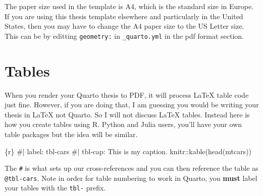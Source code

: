 \documentclass[
  letterpaper,
  11pt,
  english,
  singlespacing,
  headsepline]{MastersDoctoralThesis}
\newenvironment{Shaded}{\begin{snugshade}}{\end{snugshade}}
\newcommand{\InformationTok}[1]{\textcolor[rgb]{0.37,0.37,0.37}{#1}}
\begin{document}
The paper size used in the template is A4, which is the standard size in
Europe. If you are using this thesis template elsewhere and particularly
in the United States, then you may have to change the A4 paper size to
the US Letter size. This can be by editting \texttt{geometry:} in
\texttt{\_quarto.yml} in the pdf format section.

\section{Tables}\label{tables-1}

When you render your Quarto thesis to PDF, it will process \LaTeX{}
table code just fine. However, if you are doing that, I am guessing you
would be writing your thesis in \LaTeX{} not Quarto. So I will not
discuss \LaTeX{} tables. Instead here is how you create tables using R.
Python and Julia users, you'll have your own table packages but the idea
will be similar.

\begin{Shaded}
\begin{Highlighting}[]
\InformationTok{\textasciigrave{}\textasciigrave{}\textasciigrave{}\{r\}}
\InformationTok{\#| label: tbl{-}cars}
\InformationTok{\#| tbl{-}cap: This is my caption.}
\InformationTok{knitr::kable(head(mtcars))}
\InformationTok{\textasciigrave{}\textasciigrave{}\textasciigrave{}}
\end{Highlighting}
\end{Shaded}

The \texttt{\#\textbar{}} is what sets up our cross-references and you
can then reference the table as \texttt{@tbl-cars}. Note in order for
table numbering to work in Quarto, you \textbf{must} label your tables
with the \texttt{tbl-} prefix.
\end{document}
